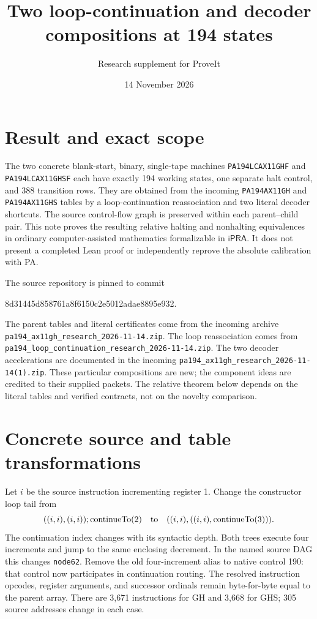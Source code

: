 \documentclass[11pt]{article}
\title{Two loop-continuation and decoder compositions at 194 states}
\author{Research supplement for ProveIt}
\date{14 November 2026}
\newcommand{\ipra}{\ensuremath{\mathsf{iPRA}}}
\begin{document}
\maketitle
\section{Result and exact scope}
The two concrete blank-start, binary, single-tape machines
\texttt{PA194LCAX11GHF} and \texttt{PA194LCAX11GHSF} each have exactly
194 working states, one separate halt control, and 388 transition rows.
They are obtained from the incoming \texttt{PA194AX11GH} and
\texttt{PA194AX11GHS} tables by a loop-continuation reassociation and two
literal decoder shortcuts. The source control-flow graph is preserved
within each parent--child pair. This note proves the resulting relative
halting and nonhalting equivalences in ordinary computer-assisted
mathematics formalizable in \ipra. It does not present a completed Lean
proof or independently reprove the absolute calibration with PA.

The source repository is pinned to commit
\begin{center}\small\ttfamily
8d31445d858761a8f6150c2e5012adae8895e932.
\end{center}
The parent tables and literal certificates come from the incoming archive
\texttt{pa194\_ax11gh\_research\_2026-11-14.zip}. The loop reassociation
comes from \texttt{pa194\_loop\_continuation\_research\_2026-11-14.zip}.
The two decoder accelerations are documented in the incoming
\texttt{pa194\_ax11gh\_research\_2026-11-14(1).zip}.
These particular compositions are new; the component ideas are credited
to their supplied packets. The relative theorem below depends on the
literal tables and verified contracts, not on the novelty comparison.

\section{Concrete source and table transformations}
Let $i$ be the source instruction incrementing register 1. Change the
constructor loop tail from
\[
 ((i,i),(i,i));\operatorname{continueTo}(2)
 \quad\hbox{to}\quad
 ((i,i),((i,i),\operatorname{continueTo}(3))).
\]
The continuation index changes with its syntactic depth. Both trees
execute four increments and jump to the same enclosing decrement.
In the named source DAG this changes \texttt{node62}. Remove the old
four-increment alias to native control 190: that control now participates
in continuation routing. The resolved instruction opcodes, register
arguments, and successor ordinals remain byte-for-byte equal to the
parent array. There are 3,671 instructions for GH and 3,668 for GHS;
305 source addresses change in each case.
\end{document}
